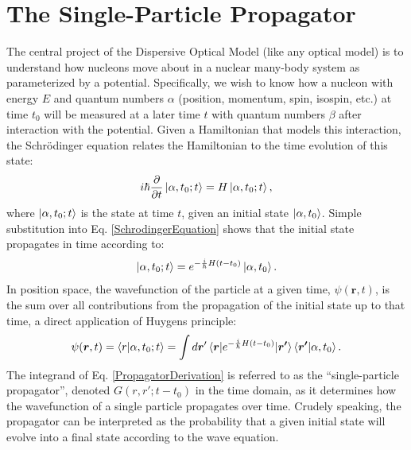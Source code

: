 \section{The Single-Particle Propagator}
The central project of the Dispersive Optical Model (like any optical model) is
to understand how nucleons move about in a nuclear many-body system as parameterized by a 
potential.
Specifically, we wish to know
how a nucleon with energy $E$ and quantum numbers $\alpha$
(position, momentum, spin, isospin, etc.) at time $t_{0}$ will be measured at a
later time $t$ with quantum numbers $\beta$ after interaction with the
potential. Given a
Hamiltonian that models this interaction, the Schr\"odinger equation
relates the Hamiltonian to the time evolution of this state:
\begin{equation} \label{SchrodingerEquation}
    i\hbar\frac{\partial}{\partial t}\ket{\alpha, t_{0}; t} = H\ket{\alpha,
    t_{0}; t},
\end{equation}
where $\ket{\alpha, t_{0}; t}$ is the state at time $t$, given an initial state
$\ket{\alpha, t_{0}}$. Simple substitution into Eq. \ref{SchrodingerEquation} shows
that the initial state propagates in time according to:
\begin{equation}
    \ket{\alpha, t_{0}; t} = e^{-\frac{i}{\hbar}H(t-t_{0})}\ket{\alpha, t_{0}}.
\end{equation}
In position space, the wavefunction of the particle at a given time, $\psi(\bm{r},t)$,
is the sum over all contributions from the propagation of the initial state up to that time,
a direct application of Huygens principle:
\begin{equation} \label{PropagatorDerivation}
    \begin{split}
        \psi(\bm{r},t) = \braket{r|\alpha, t_{0}; t}
        = \int d\bm{r}'
        \braket{\bm{r}|e^{-\frac{i}{\hbar}H(t-t_{0})}|\bm{r'}}\braket{\bm{r'}|\alpha,t_{0}}.
    \end{split}
\end{equation}
The integrand of Eq. \ref{PropagatorDerivation} is referred to as the
``single-particle \gls{propagator}'', 
denoted $G(r, r'; t-t_{0})$ in the time domain,
as it determines how the wavefunction of a single particle
propagates over time. Crudely speaking, the propagator can be interpreted as the
probability that a given
initial state will evolve into a final state according to the wave equation.

